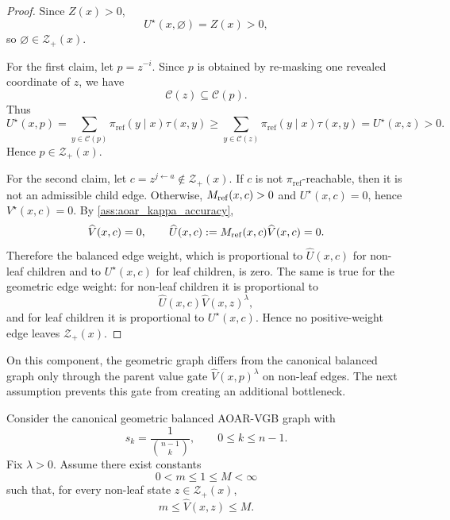 \documentclass{article}
\numberwithin{theorem}{section}
\numberwithin{proposition}{section}
\numberwithin{corollary}{section}
\numberwithin{lemma}{section}
\numberwithin{conjecture}{section}
\numberwithin{remark}{section}
\numberwithin{definition}{section}
\numberwithin{assumption}{section}
\numberwithin{example}{section}
\newcommand{\calC}{{\mathcal{C}}}
\newcommand{\calZ}{{\mathcal{Z}}}
\providecommand{\base}{\pi_{\mathrm{ref}}}
\begin{document}
\begin{proof}
Since $Z(x)>0$,
\begin{equation*}
    U^\star(x,\varnothing)=Z(x)>0,
\end{equation*}
so $\varnothing\in\calZ_+(x)$.

For the first claim, let $p=z^{-i}$. Since $p$ is obtained by re-masking one
revealed coordinate of $z$, we have
\begin{equation*}
    \calC(z)\subseteq \calC(p).
\end{equation*}
Thus
\begin{equation*}
    U^\star(x,p)
    =
    \sum_{y\in\calC(p)}\base(y\mid x)\tau(x,y)
    \ge
    \sum_{y\in\calC(z)}\base(y\mid x)\tau(x,y)
    =
    U^\star(x,z)
    >
    0.
\end{equation*}
Hence $p\in\calZ_+(x)$.

For the second claim, let $c=z^{j\leftarrow a}\notin\calZ_+(x)$. If $c$ is
not $\base$-reachable, then it is not an admissible child edge. Otherwise,
$M_{\rm ref}(x,c)>0$ and $U^\star(x,c)=0$, hence
$V^\star(x,c)=0$. By \cref{ass:aoar_kappa_accuracy},
\begin{equation*}
    \widehat V(x,c)=0,
    \qquad
    \widehat U(x,c):=M_{\rm ref}(x,c)\widehat V(x,c)=0.
\end{equation*}
Therefore the balanced edge weight, which is proportional to
$\widehat U(x,c)$ for non-leaf children and to $U^\star(x,c)$ for leaf
children, is zero. The same is true for the geometric edge weight: for non-leaf
children it is proportional to
\begin{equation*}
    \widehat U(x,c)\widehat V(x,z)^\lambda,
\end{equation*}
and for leaf children it is proportional to $U^\star(x,c)$. Hence no
positive-weight edge leaves $\calZ_+(x)$.
\end{proof}

On this component, the geometric graph differs from the canonical balanced
graph only through the parent value gate $\widehat V(x,p)^\lambda$ on
non-leaf edges. The next assumption prevents this gate from creating an
additional bottleneck.

\begin{assumption}
\label{ass:bg_gate_bounds}
Consider the canonical geometric balanced AOAR-VGB graph with
\begin{equation*}
    s_k=\frac{1}{\binom{n-1}{k}},
    \qquad 0\le k\le n-1.
\end{equation*}
Fix $\lambda>0$. Assume there exist constants
\begin{equation*}
    0<m\le 1\le M<\infty
\end{equation*}
such that, for every non-leaf state $z\in\calZ_+(x)$,
\begin{equation*}
    m
    \le
    \widehat V(x,z)
    \le
    M .
\end{equation*}
\end{assumption}
\end{document}

